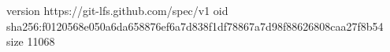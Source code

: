 version https://git-lfs.github.com/spec/v1
oid sha256:f0120568e050a6da658876ef6a7d838f1df78867a7d98f88626808caa27f8b54
size 11068
